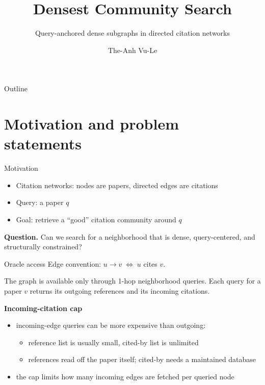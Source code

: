 \documentclass{beamer}
\title[]{Densest Community Search}
\subtitle{Query-anchored dense subgraphs in directed citation networks}
\author{The-Anh Vu-Le}
\institute[UIUC]{
University of Illinois Urbana-Champaign \\
\medskip
\textit{vltanh@illinois.edu}
}
\date{}
\begin{document}
\begin{frame}
  \titlepage
\end{frame}

\begin{frame}{Outline}
  \tableofcontents
\end{frame}

\section{Motivation and problem statements}

\begin{frame}{Motivation}
  \begin{itemize}
    \item Citation networks: nodes are papers, directed edges are citations
    \item Query: a paper $q$
    \item Goal: retrieve a ``good'' citation community around $q$
  \end{itemize}

  \vfill

  \textbf{Question.} Can we search for a neighborhood that is dense, query-centered, and structurally constrained?
\end{frame}

\begin{frame}{Oracle access}
  Edge convention: $u \to v \;\Longleftrightarrow\; u$ cites $v$.

  \vfill

  The graph is available only through 1-hop neighborhood queries. Each query for a paper $v$ returns its outgoing references and its incoming citations.

  \vfill

  \textbf{Incoming-citation cap}
  \begin{itemize}
    \item incoming-edge queries can be more expensive than outgoing:
          \begin{itemize}
            \item reference list is usually small, cited-by list is
                  unlimited
            \item references read off the paper itself; cited-by needs a
                  maintained database
          \end{itemize}
    \item the cap limits how many incoming edges are fetched per
          queried node
  \end{itemize}
\end{frame}
\end{document}
